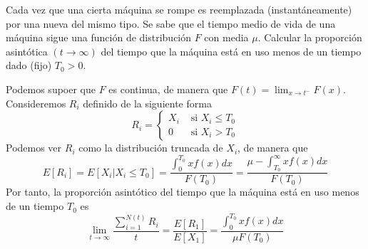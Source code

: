 \documentclass[twoside]{article}
\begin{document}
\newpage
\begin{ejercicio}{3}Cada vez que una cierta máquina se rompe es reemplazada (instantáneamente) por una nueva del mismo tipo. Se sabe que el tiempo medio de vida de una máquina sigue una función de distribución $F$ con media $\mu$. Calcular la proporción asintótica $(t\to \infty)$ del tiempo que la máquina está en uso menos de un tiempo dado (fijo) $T_0>0$.
\end{ejercicio}
\begin{solucion}
Podemos supoer que $F$ es continua, de manera que $F(t)=\lim_{x\to t^{-}} F(x)$. Consideremos $R_i$ definido de la siguiente forma
$$
R_i = \begin{cases}
X_i & \text{ si } X_i \leq T_0\\
0 & \text{ si }X_i > T_0
\end{cases}
$$
Podemos ver $R_i$ como la distribución truncada de $X_i$, de manera que
$$
E[R_i] = E[X_i | X_i \leq T_0] = \frac{\int_0^{T_0}xf(x)dx}{F(T_0)} = \frac{\mu - \int_{T_0}^\infty xf(x)dx}{F(T_0)}
$$
Por tanto, la proporción asintótico del tiempo que la máquina está en uso menos de un tiempo $T_0$ es
$$
\lim_{t\to \infty} \frac{\sum_{i=1}^{N(t)}R_i}{t} = \frac{E[R_1]}{E[X_1]} = \frac{\int_0^{T_0}xf(x)dx}{\mu F(T_0)}
$$
\end{solucion}
\end{document}
